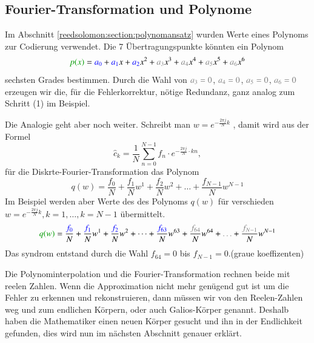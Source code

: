 \subsection{Fourier-Transformation und Polynome\label{reedsolomon:subsection:ftandpolynom}}
Im Abschnitt \ref{reedsolomon:section:polynomansatz}
wurden Werte eines Polynoms zur Codierung verwendet.
Die 7 Übertragungspunkte könnten ein Polynom
\begin{equation}
	\textcolor{darkgreen}{p(x)}
	=
	\textcolor{blue}{a_0} + \textcolor{blue}{a_1}x + \textcolor{blue}{a_2}x^2 +
	\textcolor{gray}{a_3}x^3 + \textcolor{gray}{a_4}x^4 + \textcolor{gray}{a_5}x^5 +
	\textcolor{gray}{a_6}x^6
\label{reedsolomon:equationpoly}
\end{equation}
sechsten Grades bestimmen.
Durch die Wahl von $\textcolor{gray}{a_3=0}$, $\textcolor{gray}{a_4=0}$, $\textcolor{gray}{a_5=0}$, $\textcolor{gray}{a_6=0}$ 
erzeugen wir die, für die Fehlerkorrektur,
nötige Redundanz, ganz analog zum Schritt (1) im Beispiel.
\par 
Die Analogie geht aber noch weiter.
 Schreibt man 
 \( w =
 e^{-\frac{2\pi j}{N} k}\)
 \label{reedsolomon:DFT_summand}, damit wird aus der Formel
 \begin{equation}
	\hat{c}_{k} 
	= \frac{1}{N} \sum_{n=0}^{N-1}
	{f}_n \cdot e^{-\frac{2\pi j}{N} \cdot kn}
	,\label{reedsolomon:DFT}
 \end{equation}
 für die Diskrte-Fourier-Transformation das Polynom
 \begin{equation}
	q(w)=
	\frac{{f}_0}{N} + \frac{{f}_1}{N} w^1 + \frac{{f}_2}{N} w^2 + \dots + \frac{{f}_{N-1}}{N} w^{N-1}
	\label{reedsolomon:DFT_polynom}
 \end{equation}
 Im Beispiel werden aber Werte des des Polynoms $q(w)$ für verschieden 
 \( w = e^{-\frac{2\pi j}{N} k}, k=1, \dots , k=N-1\) übermittelt.
 \begin{equation}
	\textcolor{darkgreen}{q(w)}=
	\frac{\textcolor{blue}{{f}_0}}{N} + \frac{\textcolor{blue}{{f}_1}}{N} w^1 + \frac{\textcolor{blue}{{f}_2}}{N} w^2 + \dots + 
	\frac{\textcolor{blue}{{f}_{63}}}{N} w^{63} + \frac{\textcolor{gray}{{f}_{64}}}{N} w^{64} + \textcolor{gray}{\dots} + \frac{\textcolor{gray}{{f}_{N-1}}}{N} w^{N-1}
	\label{reedsolomon:DFT_polynom2}
 \end{equation}
Das syndrom entstand durch die Wahl ${f_{64}}=0$ bis ${f}_{N-1}=0$.(graue koeffizenten)
\par
Die Polynominterpolation und die Fourier-Transformation rechnen beide mit reelen Zahlen.
Wenn die Approximation nicht mehr genügend gut ist um die Fehler zu erkennen und rekonstruieren,
dann müssen wir von den Reelen-Zahlen weg und zum endlichen Körpern, oder auch Galios-Körper genannt.
Deshalb haben die Mathematiker einen neuen Körper gesucht und ihn in der Endlichkeit gefunden,
dies wird nun im nächsten Abschnitt genauer erklärt.


